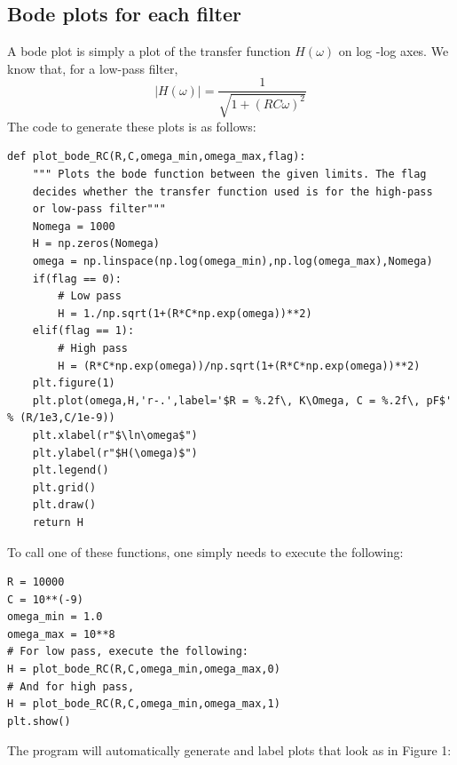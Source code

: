 \documentclass[english]{article}
\begin{document}
\subsection{Bode plots for each filter}
A bode plot is simply a plot of the transfer function $H(\omega)$ on log
-log axes. We know that, for a low-pass filter,
$$ |H(\omega)| = \frac{1}{\sqrt{1+(RC\omega)^{2}}} $$
The code to generate these plots is as follows:
\begin{lstlisting}
def plot_bode_RC(R,C,omega_min,omega_max,flag):
    """ Plots the bode function between the given limits. The flag
    decides whether the transfer function used is for the high-pass 
    or low-pass filter"""
    Nomega = 1000
    H = np.zeros(Nomega)
    omega = np.linspace(np.log(omega_min),np.log(omega_max),Nomega)
    if(flag == 0):
        # Low pass
        H = 1./np.sqrt(1+(R*C*np.exp(omega))**2)
    elif(flag == 1):
        # High pass
        H = (R*C*np.exp(omega))/np.sqrt(1+(R*C*np.exp(omega))**2)
    plt.figure(1)
    plt.plot(omega,H,'r-.',label='$R = %.2f\, K\Omega, C = %.2f\, pF$' % (R/1e3,C/1e-9))
    plt.xlabel(r"$\ln\omega$")
    plt.ylabel(r"$H(\omega)$")
    plt.legend()
    plt.grid()
    plt.draw()
    return H
\end{lstlisting}
To call one of these functions, one simply needs to execute the following:
\begin{lstlisting}
R = 10000
C = 10**(-9)
omega_min = 1.0
omega_max = 10**8
# For low pass, execute the following:
H = plot_bode_RC(R,C,omega_min,omega_max,0)
# And for high pass,
H = plot_bode_RC(R,C,omega_min,omega_max,1)
plt.show()
\end{lstlisting}
The program will automatically generate and label plots that look as in Figure 1:
\end{document}
